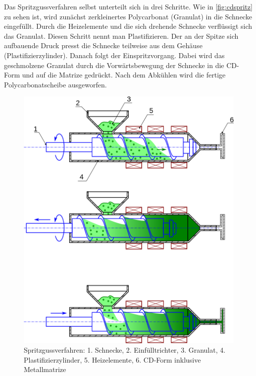 Das Spritzgussverfahren selbst unterteilt sich in drei Schritte. Wie in
\autoref{fig:cdspritz} zu sehen ist, wird zunächst zerkleinertes Polycarbonat
(Granulat) in die Schnecke eingefüllt. Durch die Heizelemente und die sich
drehende Schnecke verflüssigt sich das Granulat. Diesen Schritt nennt man
Plastifizieren. Der an der Spitze sich aufbauende Druck presst die Schnecke
teilweise aus dem Gehäuse (Plastifizierzylinder). Danach folgt der
Einspritzvorgang. Dabei wird das geschmolzene Granulat durch die
Vorwärtsbewegung der Schnecke in die CD-Form und auf die Matrize gedrückt. Nach
dem Abkühlen wird die fertige Polycarbonatscheibe ausgeworfen. \cite{cdpf}

\begin{figure}[h]
    \begin{center}
        \begin{minipage}[t]{\textwidth}
            \begin{center}
                \includegraphics[height=0.5\textheight]{Bilder/Optische_Datentraeger_Die_Compact_Disc/Herstellung/cdspritz.png}
                \caption[Spritzgussverfahren \newline \url{https://upload.wikimedia.org/wikipedia/commons/thumb/2/23/Principe_moulage_injection_polymere.svg/899px-Principe_moulage_injection_polymere.svg.png} (zuletzt aufgerufen am 11.08.2015)]{Spritzgussverfahren: 1. Schnecke, 2. Einfülltrichter, 3. Granulat, 4. Plastifizierzylinder, 5. Heizelemente, 6. CD-Form inklusive Metallmatrize}
                \label{fig:cdspritz}
            \end{center}
        \end{minipage}
    \end{center}
\end{figure}

